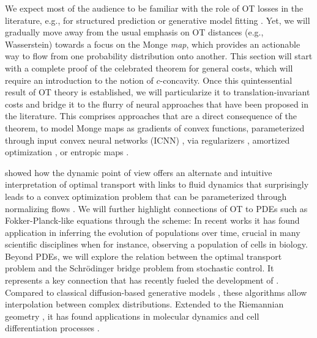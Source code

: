 We expect most of the audience to be familiar with the role of OT losses in the literature, e.g., for structured prediction \citep{frogner2015learning,janati2020multi} or generative model fitting \citep{yang2018scalable, arjovsky2017wasserstein, salimans2018improving, genevay2018learning}. Yet, we will gradually move away from the usual emphasis on OT distances (e.g., Wasserstein) towards a focus on the Monge \textit{map}, which provides an actionable way to flow from one probability distribution onto another. This section will start with a complete proof of the celebrated \citeauthor{brenier1987decomposition} theorem for general costs, which will require an introduction to the notion of $c$-concavity. Once this quintessential result of OT theory is established, we will particularize it to translation-invariant costs and bridge it to the flurry of neural approaches that have been proposed in the literature. 
This comprises approaches that are a direct consequence of the \citeauthor{brenier1987decomposition} theorem, to model Monge maps as gradients of convex functions, parameterized through input convex neural networks (ICNN) \citep{amos2017input, huang2021convex, makkuva2020optimal, korotin2021neural, lubeck2022neural, bunne2022supervised}, via regularizers \citep{uscidda2023monge}, amortized optimization \citep{amos2022amortizing, amos2022meta}, or entropic maps \citep{pooladian2021entropic, pooladian2023minimax, divol2022optimal, cuturi2023monge}.


\citet*{benamou2000computational} showed how the dynamic point of view offers an alternate and intuitive interpretation of optimal transport with links to fluid dynamics that surprisingly leads to a convex optimization problem that can be parameterized through normalizing flows \citep{tong2020trajectorynet}.
We will further highlight connections of OT to PDEs such as Fokker-Planck-like equations through the \citeauthor*{jordan1998variational} scheme: In recent works \citep{bunne2022proximal, alvarez2021optimizing, mokrov2021large, benamou2016augmented} 
it has found application in inferring the evolution of populations over time, crucial in many scientific disciplines when for instance, observing a population of cells in biology.
Beyond PDEs, we will explore the relation between the optimal transport problem and the Schr\"odinger bridge problem from stochastic control. It represents a key connection that has recently fueled the development of  \citep{de2021diffusion, chen2021stochastic, bunne2022recovering, liu2022deep}. Compared to classical diffusion-based generative models \citep{daniels2021score, song2020score}, these algorithms allow interpolation between complex distributions. Extended to the Riemannian geometry \citep{thornton2022riemannian, de2022riemannian}, it has found applications in molecular dynamics \citep{holdijk2022path} and cell differentiation processes \citep{tong2023conditional, bunne2022recovering}.

